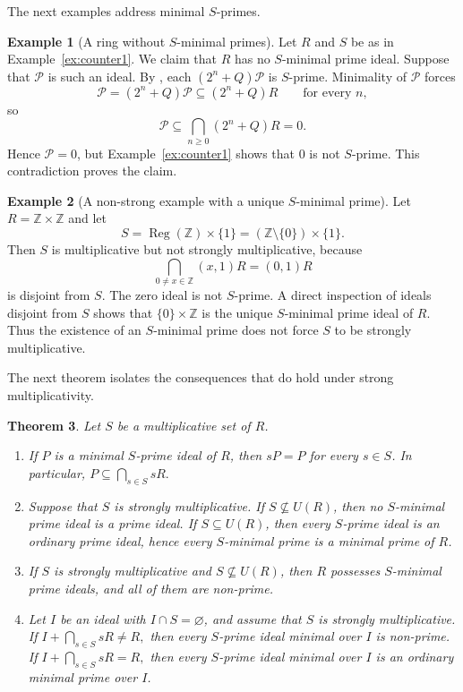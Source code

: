 \documentclass[11pt]{amsart}
\newtheorem{theorem}{Theorem}[section]
\theoremstyle{definition}
\newtheorem{example}[theorem]{Example}
\theoremstyle{remark}
\newcommand{\Reg}{\operatorname{Reg}}
\begin{document}
The next examples address minimal $S$-primes.

\begin{example}[A ring without $S$-minimal primes]\label{ex:counter3}
Let $R$ and $S$ be as in Example~\ref{ex:counter1}.
We claim that $R$ has no $S$-minimal prime ideal.
Suppose that $\mathcal P$ is such an ideal.
By \cite[Proposition~2]{Hamed}, each $(2^n+Q)\mathcal P$ is $S$-prime.
Minimality of $\mathcal P$ forces
\[
\mathcal P=(2^n+Q)\mathcal P \subseteq (2^n+Q)R
\qquad\text{for every } n,
\]
so
\[
\mathcal P \subseteq \bigcap_{n \geq 0}(2^n+Q)R=0.
\]
Hence $\mathcal P=0$, but Example~\ref{ex:counter1} shows that $0$ is not $S$-prime.
This contradiction proves the claim.
\end{example}

\begin{example}[A non-strong example with a unique $S$-minimal prime]\label{ex:counter4}
Let $R=\mathbb{Z}\times\mathbb{Z}$ and let
\[
S=\Reg(\mathbb{Z})\times\{1\}=(\mathbb{Z}\setminus\{0\})\times\{1\}.
\]
Then $S$ is multiplicative but not strongly multiplicative, because
\[
\bigcap_{0 \neq x \in \mathbb{Z}}(x,1)R=(0,1)R
\]
is disjoint from $S$.
The zero ideal is not $S$-prime.
A direct inspection of ideals disjoint from $S$ shows that $\{0\}\times\mathbb{Z}$ is the unique $S$-minimal prime ideal of $R$.
Thus the existence of an $S$-minimal prime does not force $S$ to be strongly multiplicative.
\end{example}

The next theorem isolates the consequences that do hold under strong multiplicativity.

\begin{theorem}\label{thm:sminimal}
Let $S$ be a multiplicative set of $R$.
\begin{enumerate}
\item If $P$ is a minimal $S$-prime ideal of $R$, then $sP=P$ for every $s \in S$.
In particular, $P \subseteq \bigcap_{s \in S} sR.$
\item Suppose that $S$ is strongly multiplicative.
If $S \nsubseteq U(R)$, then no $S$-minimal prime ideal is a prime ideal.
If $S \subseteq U(R)$, then every $S$-prime ideal is an ordinary prime ideal, hence every $S$-minimal prime is a minimal prime of $R$.
\item If $S$ is strongly multiplicative and $S \nsubseteq U(R)$, then $R$ possesses $S$-minimal prime ideals, and all of them are non-prime.
\item Let $I$ be an ideal with $I \cap S=\varnothing$, and assume that $S$ is strongly multiplicative.
If $I+\bigcap_{s \in S} sR \neq R,$ then every $S$-prime ideal minimal over $I$ is non-prime.
If $I+\bigcap_{s \in S} sR=R,$ then every $S$-prime ideal minimal over $I$ is an ordinary minimal prime over $I$.
\end{enumerate}
\end{theorem}
\end{document}
